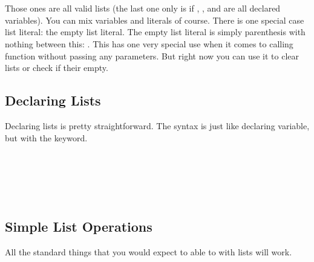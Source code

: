 \begin{SSCodeBox}
\scitea{, }
\scitea{, }
\\
\scitea{, }
\scitea{, }
\\
\end{SSCodeBox}

Those ones are all valid lists (the last one only is if , , and  are all declared variables).  You can mix variables and literals of course.  There is one special case list literal: the empty list literal.  The empty list literal is simply parenthesis with nothing between this: \SSCode{()}.  This has one very special use when it comes to calling function without passing any parameters. But right now you can use it to clear lists or check if their empty.

\subsection{Declaring Lists}

Declaring lists is pretty straightforward.  The syntax is just like declaring variable, but with the  keyword.

\begin{SSCodeBox}
 \\
\scitea{\hspace*{4em}}
\scitea{,} \\
\scitea{\hspace*{4em}}
\scitea{,} \\
\scitea{\hspace*{4em}}
\scitea{,} \\
\scitea{\hspace*{4em}}
\scitea{;}
\end{SSCodeBox}

\subsection{Simple List Operations}

\noindent{}All the standard things that you would expect to able to with lists will work.

\begin{SSCodeBox}
 \\
 \\
\end{SSCodeBox}

